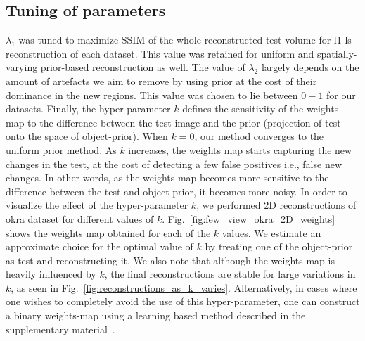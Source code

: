 \documentclass[journal]{IEEEtran}
\begin{document}
\subsection{Tuning of parameters}
\label{subsec:k}
 $\lambda_1$ was tuned to maximize
SSIM of the whole reconstructed test volume for l1-ls reconstruction
of each dataset. This value was retained for uniform and
spatially-varying prior-based reconstruction as well. The value of
$\lambda_2$ largely depends on the amount of artefacts we aim to
remove by using prior at the cost of their dominance in the new
regions. This value was chosen to lie between $0-1$ for our
datasets. Finally, the hyper-parameter $k$ defines the sensitivity of
the weights map to the difference between the test image and the prior
(projection of test onto the space of object-prior). When $k=0$, our
method converges to the uniform prior method. As $k$ increases, the
weights map starts capturing the new changes in the test, at the cost
of detecting a few false positives i.e., false new changes. In other
words, as the weights map becomes more sensitive to the difference
between the test and object-prior, it becomes more noisy. In order to
visualize the effect of the hyper-parameter $k$, we performed 2D
reconstructions of okra dataset for different values of
$k$. Fig.~\ref{fig:few_view_okra_2D_weights} shows the weights map
obtained for each of the $k$ values. We estimate an approximate choice
for the optimal value of $k$ by treating one of the object-prior as
test and reconstructing it. We also note that although the weights map
is heavily influenced by $k$, the final reconstructions are stable for
large variations in $k$, as seen in
Fig.~\ref{fig:reconstructions_as_k_varies}. Alternatively, in cases
where one wishes to completely avoid the use of this hyper-parameter,
one can construct a binary weights-map using a learning based method
described in the supplementary material~\cite{supp_paper}.

\end{document}
